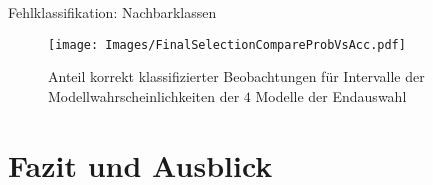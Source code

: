 \documentclass[8pt, xcolor = dvipsnames]{beamer}
\begin{document}
\begin{frame}{Fehlklassifikation: Nachbarklassen}
\end{frame}




\begin{frame}
\begin{figure}[ht]
    \centering
\texttt{[image: Images/FinalSelectionCompareProbVsAcc.pdf]} 
\caption{Anteil korrekt klassifizierter Beobachtungen für Intervalle der Modellwahrscheinlichkeiten der $4$ Modelle der Endauswahl}
\label{abb:CompareProbVsAcc}
\end{figure}
\end{frame}




\section{Fazit und Ausblick}
\end{document}
